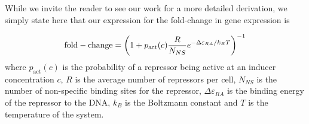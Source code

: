 \documentclass[letterpaper, 10pt]{article}
\begin{document}
\begin{figure}
  \label{fig:simple_repression}
\end{figure}



While we invite the reader to see our work for a more detailed derivation, we
simply state here that our expression for the fold-change in gene expression is

\begin{equation}
\mathrm{fold-change} = \left(1 + p_\mathrm{act}(c) {R \over
N_{NS}}e^{-\Delta\varepsilon_{RA}/ k_BT}\right)^{-1}
\label{eq:fold-change}
\end{equation}
where $p_\mathrm{act}(c)$ is the probability of a repressor being active at an
inducer concentration $c$, $R$ is the average number of repressors per cell,
$N_{NS}$ is the number of non-specific binding sites for the repressor,
$\Delta\varepsilon_{RA}$ is the binding energy of the repressor to the DNA,
$k_B$ is the Boltzmann constant and $T$ is the temperature of the system.
\end{document}
